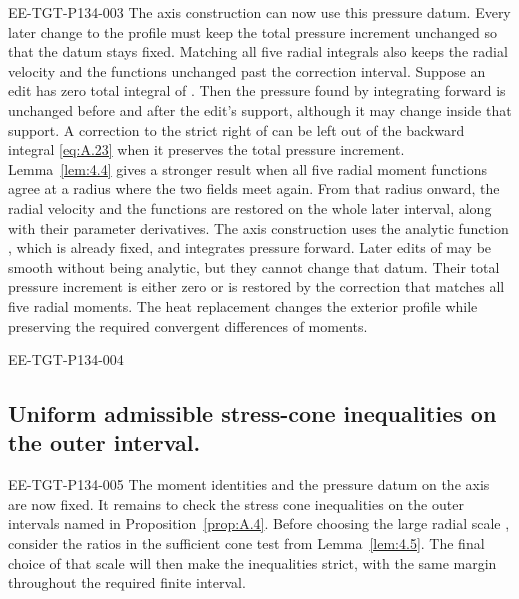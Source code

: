 \begin{EESegment}{EE-TGT-P134-003}
The axis construction can now use this pressure datum. Every later change to the profile must keep the total pressure
increment unchanged so that the datum stays fixed. Matching all five radial integrals also keeps the radial velocity and
the functions  unchanged past the correction interval. Suppose an edit has zero total
integral of . Then the pressure found by integrating
forward is unchanged before and after the edit's support, although it may change inside that support. A correction to the
strict right of  can be left out of the backward integral \eqref{eq:A.23} when it
preserves the total pressure increment. Lemma~\ref{lem:4.4} gives a stronger result when all five radial moment functions
agree at a radius where the two fields meet again. From that radius onward, the radial velocity and the functions
 are restored on the whole later interval, along with their parameter derivatives. The axis
construction uses the analytic function , which is already fixed, and integrates pressure
forward. Later edits of  may be smooth without being analytic, but they cannot change that datum.
Their total pressure increment is either zero or is restored by the correction that matches all five radial moments. The
heat replacement changes the exterior profile while preserving the required convergent differences of moments.
\end{EESegment}

\begin{EESegment}{EE-TGT-P134-004}
\subsection{Uniform admissible stress-cone inequalities on the outer interval.}\label{sec:A.5}
\end{EESegment}
\begin{EESegment}{EE-TGT-P134-005}
The moment identities and the pressure datum on the axis are now fixed. It remains to check the stress cone inequalities
on the outer intervals named in Proposition~\ref{prop:A.4}. Before choosing the large radial scale
, consider the ratios in the sufficient cone test from Lemma~\ref{lem:4.5}. The final choice of
that scale will then make the inequalities strict, with the same margin throughout the required finite interval.
\end{EESegment}

